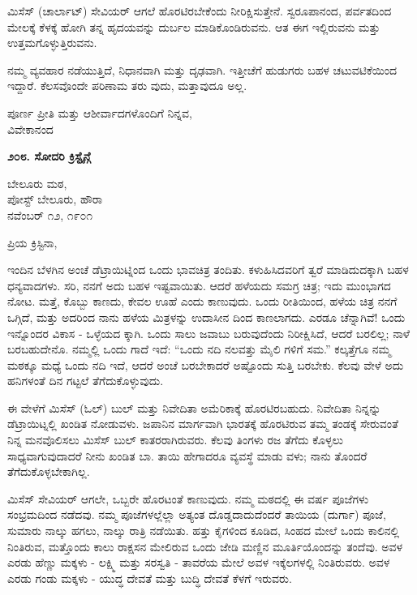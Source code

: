 ಮಿಸೆಸ್ (ಚಾರ್ಲಾಟ್) ಸೇವಿಯರ್ ಆಗಲೆ ಹೊರಟಿರಬೇಕೆಂದು ನೀರಿಕ್ಷಿಸುತ್ತೇನೆ. ಸ್ವರೂಪಾನಂದ, ಪರ್ವತದಿಂದ ಮೇಲಕ್ಕೆ ಕೆಳಕ್ಕೆ ಹೋಗಿ ತನ್ನ ಹೃದಯವನ್ನು ದುರ್ಬಲ ಮಾಡಿಕೊಂಡಿರುವನು. ಆತ ಈಗ ಇಲ್ಲಿರುವನು ಮತ್ತು ಉತ್ತಮಗೊಳ್ಳುತ್ತಿರುವನು.

ನಮ್ಮ ವ್ಯವಹಾರ ನಡೆಯುತ್ತಿದೆ, ನಿಧಾನವಾಗಿ ಮತ್ತು ದೃಢವಾಗಿ. ಇತ್ತೀಚೆಗೆ ಹುಡುಗರು ಬಹಳ ಚಟುವಟಿಕೆಯಿಂದ ಇದ್ದಾರೆ. ಕೆಲಸವೊಂದೇ ಪರಿಣಾಮ ತರು ವುದು, ಮತ್ತಾವುದೂ ಅಲ್ಲ.

\begin{flushright}
ಪೂರ್ಣ ಪ್ರೀತಿ ಮತ್ತು ಆಶೀರ್ವಾದಗಳೊಂದಿಗೆ ನಿನ್ನವ,\\ವಿವೇಕಾನಂದ
\end{flushright}

\begin{center}
\textbf{೨೦೮. ಸೋದರಿ ಕ್ರಿಸ್ಟೈನ್ಗೆ}
\end{center}

\begin{flushright}
ಬೇಲೂರು ಮಠ,\\ಪೋಸ್ಟ್ ಬೇಲೂರು, ಹೌರಾ\\ನವೆಂಬರ್ ೧೨, ೧೯೦೧
\end{flushright}

ಪ್ರಿಯ ಕ್ರಿಸ್ಟಿನಾ,

ಇಂದಿನ ಬೆಳಗಿನ ಅಂಚೆ ಡೆಟ್ರಾಯಿಟ್ನಿಂದ ಒಂದು ಭಾವಚಿತ್ರ ತಂದಿತು. ಕಳುಹಿಸಿದವರಿಗೆ ತ್ವರೆ ಮಾಡಿದುದಕ್ಕಾಗಿ ಬಹಳ ಧನ್ಯವಾದಗಳು. ಸರಿ, ನನಗೆ ಅದು ಬಹಳ ಇಷ್ಟವಾಯಿತು. ಆದರೆ ಹಳೆಯದು ಸಮಗ್ರ ಚಿತ್ರ; ಇದು ಮುಂಭಾಗದ ನೋಟ. ಮತ್ತೆ, ಕೊಬ್ಬು ಕಾಣದು, ಕೇವಲ ಊಹೆ ಎಂದು ಕಾಣುವುದು. ಒಂದು ರೀತಿಯಿಂದ, ಹಳೆಯ ಚಿತ್ರ ನನಗೆ ಒಗ್ಗಿದೆ, ಮತ್ತು ಅದರಿಂದ ನಾನು ಹಳೆಯ ಮಿತ್ರಳನ್ನು ಉದಾಸೀನ ದಿಂದ ಕಾಣಲಾಗದು. ಎರಡೂ ಚೆನ್ನಾಗಿವೆ! ಒಂದು ಇನ್ನೊಂದರ ವಿಕಾಸ - ಒಳ್ಳೆಯದ ಕ್ಕಾಗಿ. ಒಂದು ಸಾಲು ಜವಾಬು ಬರುವುದೆಂದು ನಿರೀಕ್ಷಿಸಿದೆ, ಆದರೆ ಬರಲಿಲ್ಲ; ನಾಳೆ ಬರಬಹುದೇನೊ. ನಮ್ಮಲ್ಲಿ ಒಂದು ಗಾದೆ ಇದೆ: “ಒಂದು ನದಿ ನಲವತ್ತು ಮೈಲಿ ಗಳಿಗೆ ಸಮ.” ಕಲ್ಕತ್ತೆಗೂ ನಮ್ಮ ಮಠಕ್ಕೂ ಮಧ್ಯೆ ಒಂದು ನದಿ ಇದೆ, ಆದರೆ ಅಂಚೆ ಬರಬೇಕಾದರೆ ಅಷ್ಟೊಂದು ಸುತ್ತಿ ಬರಬೇಕು. ಕೆಲವು ವೇಳೆ ಅದು ಹನಿಗಳಂತೆ ದಿನ ಗಟ್ಟಲೆ ತೆಗೆದುಕೊಳ್ಳುವುದು.

ಈ ವೇಳೆಗೆ ಮಿಸೆಸ್ (ಓಲ್) ಬುಲ್ ಮತ್ತು ನಿವೇದಿತಾ ಅಮೆರಿಕಾಕ್ಕೆ ಹೊರಟಿರಬಹುದು. ನಿವೇದಿತಾ ನಿನ್ನನ್ನು ಡೆಟ್ರಾಯಿಟ್ನಲ್ಲಿ ಖಂಡಿತ ನೋಡುವಳು. ಜಪಾನಿನ ಮಾರ್ಗವಾಗಿ ಭಾರತಕ್ಕೆ ಹೊರಟಿರುವ ತಮ್ಮ ತಂಡಕ್ಕೆ ಸೇರುವಂತೆ ನಿನ್ನ ಮನವೊಲಿಸಲು ಮಿಸೆಸ್ ಬುಲ್ ಕಾತರರಾಗಿರುವರು. ಕೆಲವು ತಿಂಗಳು ರಜ ತೆಗೆದು ಕೊಳ್ಳಲು ಸಾಧ್ಯವಾಗುವುದಾದರೆ ನೀನು ಖಂಡಿತ ಬಾ. ತಾಯಿ ಹೇಗಾದರೂ ವ್ಯವಸ್ಥೆ ಮಾಡು ವಳು; ನಾನು ತೊಂದರೆ ತೆಗೆದುಕೊಳ್ಳಬೇಕಾಗಿಲ್ಲ.

ಮಿಸೆಸ್ ಸೇವಿಯರ್ ಆಗಲೇ, ಒಬ್ಬರೇ ಹೊರಟಂತೆ ಕಾಣುವುದು. ನಮ್ಮ ಮಠದಲ್ಲಿ ಈ ವರ್ಷ ಪೂಜೆಗಳು ಸಂಭ್ರಮದಿಂದ ನಡೆದವು. ನಮ್ಮ ಪೂಜೆಗಳಲ್ಲೆಲ್ಲಾ ಅತ್ಯಂತ ದೊಡ್ಡದಾದುದೆಂದರೆ ತಾಯಿಯ (ದುರ್ಗಾ) ಪೂಜೆ, ಸುಮಾರು ನಾಲ್ಕು ಹಗಲು, ನಾಲ್ಕು ರಾತ್ರಿ ನಡೆಯಿತು. ಹತ್ತು ಕೈಗಳಿಂದ ಕೂಡಿದ, ಸಿಂಹದ ಮೇಲೆ ಒಂದು ಕಾಲಿನಲ್ಲಿ ನಿಂತಿರುವ, ಮತ್ತೊಂದು ಕಾಲು ರಾಕ್ಷಸನ ಮೇಲಿರುವ ಒಂದು ಜೇಡಿ ಮಣ್ಣಿನ ಮೂರ್ತಿಯೊಂದನ್ನು ತಂದೆವು. ಅವಳ ಎರಡು ಹೆಣ್ಣು ಮಕ್ಕಳು - ಲಕ್ಷ್ಮಿ ಮತ್ತು ಸರಸ್ವತಿ - ತಾವರೆಯ ಮೇಲೆ ಅವಳ ಇಕ್ಕೆಲಗಳಲ್ಲಿ ನಿಂತಿರುವರು. ಅವಳ ಎರಡು ಗಂಡು ಮಕ್ಕಳು - ಯುದ್ಧ ದೇವತೆ ಮತ್ತು ಬುದ್ಧಿ ದೇವತೆ ಕೆಳಗೆ ಇರುವರು.

